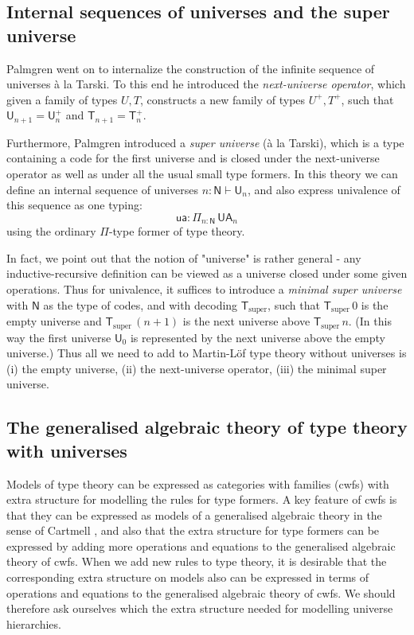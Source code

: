 \documentclass[11pt,a4paper]{article}
\def\NN{\mathsf{N}}
\def\UU{\mathsf{U}}
\newcommand{\N}{\mathsf{N}}
\newcommand{\T}{\mathsf{T}}
\newcommand{\Tsuper}{\T_{\mathrm{super}}}
\newcommand{\ua}{\mathsf{ua}}
\newcommand{\UA}{\mathsf{UA}}
\begin{document}
\subsection{Internal sequences of universes and the super universe}

Palmgren \cite{palmgren:venice} went on to internalize the construction of the infinite sequence of universes  \`a la Tarski. To this end he introduced the {\em next-universe operator}, which given a family of types $U, T$, constructs a new family of types $U^+, T^+$, such that $ \UU_{n+1} = \UU_n^+$ and $\T_{n+1} = \T_n^+$.

Furthermore, Palmgren introduced a {\em super universe} (\`a la Tarski), which is a type containing a code for the first universe and is closed under the next-universe operator as well as under all the usual small type formers. In this theory we can define an internal sequence of universes $n : \NN \vdash \UU_n$, and also express univalence of this sequence as one typing:
$$
\ua : \Pi_{n : \N}\, \UA_n
$$
using the ordinary $\Pi$-type former of type theory.

In fact, we point out that the notion of "universe" is rather general - any inductive-recursive definition can be viewed as a universe closed under some given operations. Thus for univalence, it suffices to introduce a {\em minimal super universe} with $\N$ as the type of codes, and with decoding $\Tsuper$,
such that $\Tsuper\,0$ is the empty universe and $\Tsuper\,(n + 1)$ is the next universe above $\Tsuper\,n$. (In this way the first universe $\UU_0$ is represented by the next universe above the empty universe.) Thus all we need to add to Martin-Löf type theory without universes is (i) the empty universe, (ii) the next-universe operator, (iii) the minimal super universe.


\subsection{The generalised algebraic theory of type theory with universes}

Models of type theory can be expressed as categories with families (cwfs) with extra structure for modelling the rules for type formers.  A key feature of cwfs is that they can be expressed as models of a generalised algebraic theory in the sense of Cartmell \cite{cartmell:apal}, and also that the extra structure for type formers can be expressed by adding more operations and equations to the generalised algebraic theory of cwfs. When we add new rules to type theory, it is desirable that the corresponding extra structure on  models also can be expressed in terms of operations and equations to the generalised algebraic theory of cwfs. We should therefore ask ourselves which the extra structure needed for modelling universe hierarchies.
\end{document}
